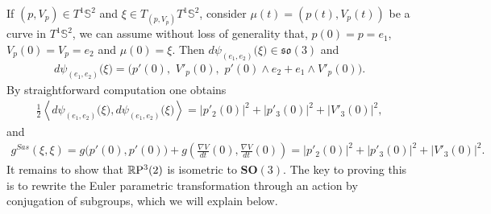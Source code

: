 \documentclass[reqno,11pt]{amsart}
\begin{document}
\noindent 
If $(p,V_p) \in T^1\mathbb{S}^2$ and $\xi \in T_{(p,V_p)} T^1\mathbb{S}^2$, consider $\mu(t) = (p(t), V_p(t))$ be a curve in $T^1\mathbb{S}^2$, we can assume without loss of generality that, $p(0)= p = e_1$, $V_p(0) = V_p = e_2$ and $\mu(0) = \xi$. Then $d\psi_{(e_1,e_2)}\big(\xi\big) \in \mathfrak{so}(3)$ and
\begin{align*}
    d\psi_{(e_1,e_2)}\big(\xi\big) = \bigg(p'(0), \,\, V'_p(0), \,\, p'(0)\wedge e_2 + e_1 \wedge V'_p(0)\bigg).
\end{align*}
By straightforward computation one obtains
\begin{align*}
    \frac{1}{2}\left\langle d\psi_{(e_1,e_2)}\big(\xi\big) ,d\psi_{(e_1,e_2)}\big(\xi\big) \right\rangle = |p'_2(0)|^2 + |p'_3(0)|^2 + |V'_3(0)|^2, 
\end{align*}
and
\begin{align*}
    g^{Sas}(\xi, \xi)= g\big(p'(0), p'(0)\big) + g \left( \frac{\nabla V}{dt}(0), \frac{\nabla V}{dt}(0) \right) = |p'_2(0)|^2 + |p'_3(0)|^2 + |V'_3(0)|^2. 
\end{align*}
It remains to show that $\mathbb{R}\rm{P}^3(2)$ is isometric to $\mathbf{SO}(3)$. The key to proving this is to rewrite the Euler parametric transformation through an action by conjugation of subgroups, which we will explain below.
\end{document}
